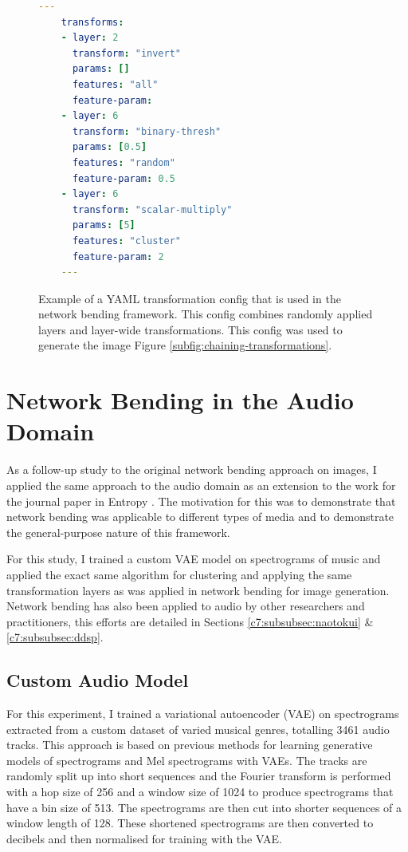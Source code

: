  \begin{figure}[!htb]
 \begin{lstlisting}[language=yaml]
    ---
    transforms:
    - layer: 2
      transform: "invert"
      params: []
      features: "all"
      feature-param: 
    - layer: 6
      transform: "binary-thresh"
      params: [0.5]
      features: "random"
      feature-param: 0.5
    - layer: 6
      transform: "scalar-multiply"
      params: [5]
      features: "cluster"
      feature-param: 2
    ---
    \end{lstlisting}
    \caption[Example YAML transformation config]{Example of a YAML transformation config that is used in the network bending framework. This config combines randomly applied layers and layer-wide transformations. This config was used to generate the image Figure \ref{subfig:chaining-transformations}.}
    \label{fig:c5:yaml-transform-config}
 \end{figure}

\section{Network Bending in the Audio Domain}
\label{c5:sec:net-bend-audio}

As a follow-up study to the original network bending approach on images, I applied the same approach to the audio domain as an extension to the work for the journal paper in Entropy \citep{broad2022network}. 
The motivation for this was to demonstrate that network bending was applicable to different types of media and to demonstrate the general-purpose nature of this framework. 

For this study, I trained a custom VAE model on spectrograms of music and applied the exact same algorithm for clustering and applying the same transformation layers as was applied in network bending for image generation. 
Network bending has also been applied to audio by other researchers and practitioners, this efforts are detailed in Sections \ref{c7:subsubsec:naotokui} \& \ref{c7:subsubsec:ddsp}.

\subsection{Custom Audio Model}

For this experiment, I trained a variational autoencoder (VAE) \citep{kingma2013auto,rezende2014stochastic} on spectrograms extracted from a custom dataset of varied musical genres, totalling 3461 audio tracks. This approach is based on previous methods for learning generative models of spectrograms \citep{akten2018granma} and Mel spectrograms \citep{valenzuela2021melspecvae} with VAEs. The tracks are randomly split up into short sequences and the Fourier transform is performed with a hop size of 256 and a window size of 1024 to produce spectrograms that have a bin size of 513. The spectrograms are then cut into shorter sequences of a window length of 128. These shortened spectrograms are then converted to decibels and then normalised for training with the VAE.  

